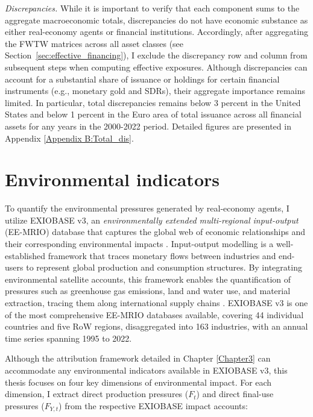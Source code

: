 \textit{Discrepancies.} While it is important to verify that each component sums to the aggregate macroeconomic totals, discrepancies do not have economic substance as either real-economy agents or financial institutions. Accordingly, after aggregating the FWTW matrices across all asset classes (see Section~\ref{sec:effective_financing}), I exclude the discrepancy row and column from subsequent steps when computing effective exposures. Although discrepancies can account for a substantial share of issuance or holdings for certain financial instruments (e.g., monetary gold and SDRs), their aggregate importance remains limited. In particular, total discrepancies remains below 3 percent in the United States and below 1 percent in the Euro area of total issuance across all financial assets for any years in the 2000-2022 period. Detailed figures are presented in Appendix \ref{Appendix B:Total_dis}.

\section{Environmental indicators}

To quantify the environmental pressures generated by real-economy agents, I utilize EXIOBASE v3, an \textit{environmentally extended multi-regional input-output} (EE-MRIO) database that captures the global web of economic relationships and their corresponding environmental impacts \citep{stadler_exiobase_2018}. Input-output modelling is a well-established framework that traces monetary flows between industries and end-users to represent global production and consumption structures. By integrating environmental satellite accounts, this framework enables the quantification of pressures such as greenhouse gas emissions, land and water use, and material extraction, tracing them along international supply chains \citep{hauschild_life_2018, leclerc_building_2020}. EXIOBASE v3 is one of the most comprehensive EE-MRIO databases available, covering 44 individual countries and five RoW regions, disaggregated into 163 industries, with an annual time series spanning 1995 to 2022.

Although the attribution framework detailed in Chapter \ref{Chapter3} can accommodate any environmental indicators available in EXIOBASE v3, this thesis focuses on four key dimensions of environmental impact. For each dimension, I extract direct production pressures ($F_t$) and direct final-use pressures ($F_{Y,t}$) from the respective EXIOBASE impact accounts:

